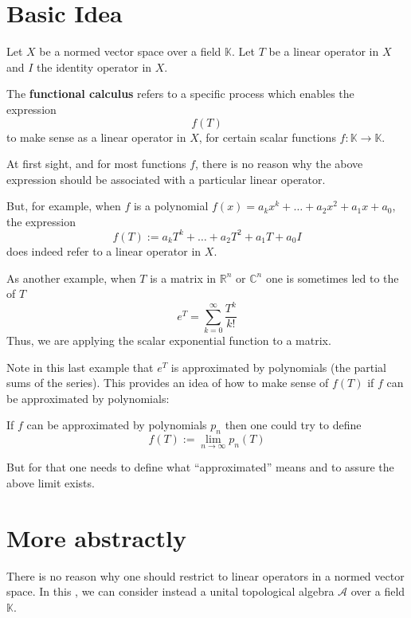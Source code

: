 \documentclass[12pt]{article}
\begin{document}

\section{Basic Idea}
Let $X$ be a normed vector space over a field $\mathbb{K}$. Let $T$ be a linear operator in $X$ and $I$ the identity operator in $X$.

The  {\bf functional calculus} refers to a specific process which enables the expression
\begin{displaymath}
f(T)
\end{displaymath}
to make sense as a linear operator in $X$, for certain scalar functions $f: \mathbb{K} \longrightarrow \mathbb{K}$.

At first sight, and for most functions $f$, there is no reason why the above expression should be associated with a particular linear operator.

But, for example, when $f$ is a polynomial $f(x)=a_kx^k + \dots + a_2x^2 + a_1x + a_0$, the expression
\begin{displaymath}
f(T):=a_kT^k + \dots + a_2T^2 + a_1T +a_0I
\end{displaymath}
does indeed refer to a linear operator in $X$.

As another example, when $T$ is a matrix in $\mathbb{R}^n$ or $\mathbb{C}^n$ one is sometimes led to the  of $T$
\begin{displaymath}
e^T=\sum_{k=0}^{\infty} \frac{T^k}{k!}
\end{displaymath}
Thus, we are applying the scalar exponential function to a matrix.

Note in this last example that $e^T$ is approximated by polynomials (the partial sums of the series). This provides an idea of how to make sense of $f(T)$ if $f$ can be approximated by polynomials:

If $f$ can be approximated by polynomials $p_n$ then one could try to define
\begin{displaymath}
f(T):=\lim_{n \rightarrow \infty} p_n(T)
\end{displaymath}

But for that one needs to define what ``approximated'' means and to assure the above limit exists.

\section{More abstractly}
There is no reason why one should restrict to linear operators in a normed vector space. In this , we can consider instead a unital topological algebra $\mathcal{A}$ over a field $\mathbb{K}$.
\end{document}
